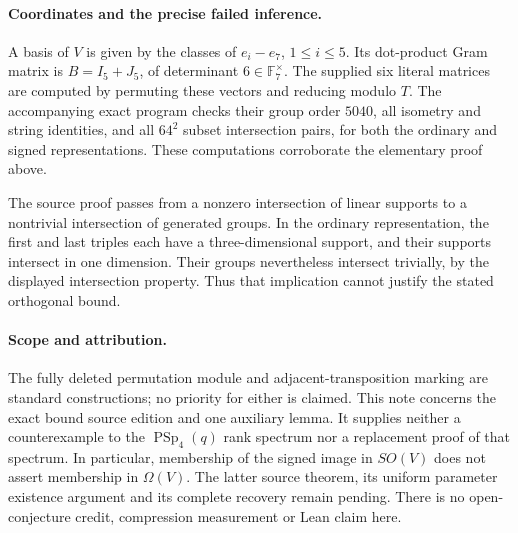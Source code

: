 \documentclass[11pt,a4paper]{article}
\begin{document}
\paragraph{Coordinates and the precise failed inference.}
A basis of $V$ is given by the classes of $e_i-e_7$, $1\le i\le5$.
Its dot-product Gram matrix is $B=I_5+J_5$, of determinant
$6\in\mathbb F_7^\times$. The supplied six literal matrices are
computed by permuting these vectors and reducing modulo $T$.
The accompanying exact program checks their group order $5040$,
all isometry and string identities, and all $64^2$ subset
intersection pairs, for both the ordinary and signed representations.
These computations corroborate the elementary proof above.

The source proof passes from a nonzero intersection of linear supports
to a nontrivial intersection of generated groups. In the ordinary
representation, the first and last triples each have a three-dimensional
support, and their supports intersect in one dimension. Their groups
nevertheless intersect trivially, by the displayed intersection property.
Thus that implication cannot justify the stated orthogonal bound.

\paragraph{Scope and attribution.}
The fully deleted permutation module and adjacent-transposition
marking are standard constructions; no priority for either is claimed.
This note concerns the exact bound source edition and one auxiliary
lemma. It supplies neither a counterexample to the $\operatorname{PSp}_4(q)$
rank spectrum nor a replacement proof of that spectrum. In particular,
membership of the signed image in $SO(V)$ does not assert membership
in $\Omega(V)$. The latter source theorem, its uniform parameter
existence argument and its complete recovery remain pending. There is
no open-conjecture credit, compression measurement or Lean claim here.
\end{document}
